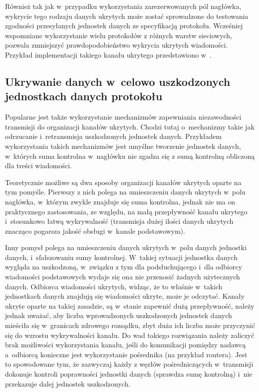 \documentclass[a4paper, twoside, 12pt]{report}
\begin{document}
        Również tak jak w~przypadku wykorzystania zarezerwowanych pól nagłówka,
        wykrycie tego rodzaju danych ukrytych może zostać sprowadzone do testowania
        zgodności przesyłanych jednostek danych ze specyfikacją protokołu. Wcześniej wspomniane
        wykorzystanie wielu protokołów z różnych warstw sieciowych, pozwala zmniejszyć
        prawdopodobieństwo wykrycia ukrytych wiadomości. Przykład implementacji
        takiego kanału ukrytego przedstawiono w~\cite{PADSTEG}.

        \subsection{Ukrywanie danych w~celowo uszkodzonych jednostkach danych protokołu} \label{USZKODZONEPAKIETY}
        Popularne jest także wykorzystanie mechanizmów zapewniania niezawodności
        transmisji do organizacji kanałów ukrytych. Chodzi tutaj o~mechanizmy
        takie jak odrzucanie i~retransmisja uszkodzonych jednostek danych. Przykładem wykorzystania takich
        mechanizmów jest umyślne tworzenie jednostek danych, w~których suma kontrolna w~nagłówku
        nie zgadza się z sumą kontrolną obliczoną dla treści wiadomości.

        Teoretycznie możliwe są dwa
        sposoby organizacji kanałów ukrytych oparte na tym pomyśle. Pierwszy z nich polega na umieszczeniu
        danych ukrytych w~polu nagłówka, w~którym zwykle znajduje się suma kontrolna,
        jednak nie ma on praktycznego zastosowania, ze względu, na małą przepływność
        kanału ukrytego i~stosunkowo łatwą wykrywalność (transmisja dużej ilości
        danych ukrytych znacząco pogarsza jakość obsługi w~kanale podstawowym).

        Inny pomysł polega
        na umieszczeniu danych ukrytych w~polu danych jednostki danych, i~sfałszowaniu sumy
        kontrolnej. W~takiej sytuacji jednostka danych wygląda na uszkodzoną, w~związku z tym
        dla podsłuchującego i~dla odbiorcy wiadomości podstawowych wydaje się
        ona nie przenosić żadnych użytecznych danych. Odbiorca wiadomości ukrytych,
        widząc, że to właśnie w~takich jednostkach danych znajdują się wiadomości ukryte,
        może je odczytać. Kanały ukryte oparte na takiej zasadzie, są w~stanie
        zapewnić dużą przepływność, należy jednak uważać, aby liczba wprowadzonych
        uszkodzonych jednostek danych mieściła się w~granicach zdrowego rozsądku, zbyt duża
        ich liczba może przyczynić się do wzrostu wykrywalności kanału. Do wad takiego
        rozwiązania należy zaliczyć brak możliwości wykorzystania kanału, jeśli do
        komunikacji pomiędzy nadawcą a~odbiorcą konieczne jest wykorzystanie pośrednika (na przykład routera).
        Jest to spowodowane tym, że zazwyczaj każdy z węzłów pośredniczących w~transmisji
        dokonuje kontroli poprawności jednostki danych (sprawdza sumę kontrolną) i~nie przekazuje
        dalej jednostek uszkodzonych.
\end{document}
